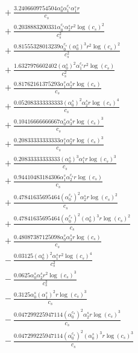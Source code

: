 \documentclass[10pt]{article}
\begin{document}
\begin{align*}
&{}  + \frac{3.2406609754504 \alpha_{0}^s \alpha_{1}^{c_s} \alpha_{1}^s r}{c_{s}} \\
&{}  + \frac{0.2038883200331 \alpha_{0}^{c_s} \alpha_{2}^s r^{2} \log{\left(c_{s} \right)}^{2}}{c_{s}^{2}} \\
&{}  + \frac{0.81555328013239 \alpha_{0}^{c_s} \left(\alpha_{0}^s\right)^{3} r^{2} \log{\left(c_{s} \right)}^{2}}{c_{s}^{2}} \\
&{}  + \frac{1.6327976602402 \left(\alpha_{0}^s\right)^{2} \alpha_{1}^{c_s} r^{2} \log{\left(c_{s} \right)}}{c_{s}^{2}} \\
&{}  + \frac{0.81762161375293 \alpha_{1}^s \alpha_{2}^s r \log{\left(c_{s} \right)}}{c_{s}} \\
&{}  + \frac{0.052083333333333 \left(\alpha_{0}^s\right)^{2} \alpha_{2}^s r \log{\left(c_{s} \right)}^{4}}{c_{s}} \\
&{}  + \frac{0.10416666666667 \alpha_{0}^s \alpha_{3}^s r \log{\left(c_{s} \right)}^{3}}{c_{s}} \\
&{}  + \frac{0.20833333333333 \alpha_{1}^s \alpha_{2}^s r \log{\left(c_{s} \right)}^{3}}{c_{s}} \\
&{}  + \frac{0.20833333333333 \left(\alpha_{0}^s\right)^{3} \alpha_{1}^s r \log{\left(c_{s} \right)}^{3}}{c_{s}} \\
&{}  + \frac{0.94410483184306 \alpha_{1}^s \alpha_{2}^{c_s} r \log{\left(c_{s} \right)}}{c_{s}} \\
&{}  + \frac{0.47841635695464 \left(\alpha_{0}^{c_s}\right)^{2} \alpha_{2}^s r \log{\left(c_{s} \right)}^{2}}{c_{s}} \\
&{}  + \frac{0.47841635695464 \left(\alpha_{0}^{c_s}\right)^{2} \left(\alpha_{0}^s\right)^{3} r \log{\left(c_{s} \right)}^{2}}{c_{s}} \\
&{}  + \frac{0.48087387125098 \alpha_{0}^s \alpha_{3}^s r \log{\left(c_{s} \right)}}{c_{s}} \\
&{}  - \frac{0.03125 \left(\alpha_{0}^s\right)^{2} \alpha_{1}^s r^{2} \log{\left(c_{s} \right)}^{4}}{c_{s}^{2}} \\
&{}  - \frac{0.0625 \alpha_{0}^s \alpha_{2}^s r^{2} \log{\left(c_{s} \right)}^{3}}{c_{s}^{2}} \\
&{}  - \frac{0.3125 \alpha_{0}^s \left(\alpha_{1}^s\right)^{2} r \log{\left(c_{s} \right)}^{3}}{c_{s}} \\
&{}  - \frac{0.047299225947114 \left(\alpha_{0}^{c_s}\right)^{2} \alpha_{2}^s r \log{\left(c_{s} \right)}^{3}}{c_{s}} \\
&{}  - \frac{0.047299225947114 \left(\alpha_{0}^{c_s}\right)^{2} \left(\alpha_{0}^s\right)^{3} r \log{\left(c_{s} \right)}^{3}}{c_{s}} \\

\end{align*}
\end{document}
